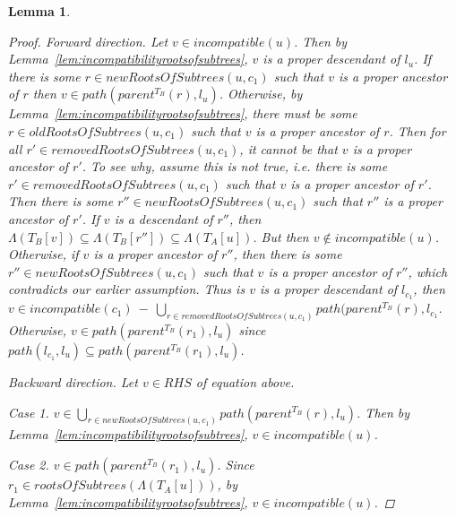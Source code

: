 \documentclass{article}
\newcommand{\leafset}{\Lambda}
\newtheorem{incompatibilityrecursive}[incompatibility]{Lemma}
\begin{document}
\begin{incompatibilityrecursive}
\begin{proof}
            \textit{Forward direction.} Let $v \in incompatible(u)$. Then by Lemma~\ref{lem:incompatibilityrootsofsubtrees}, $v$ is a proper descendant of $l_u$. If there is some $r \in newRootsOfSubtrees(u, c_1)$ such that $v$ is a proper ancestor of $r$ then $v \in path(parent^{T_B}(r), l_u)$. Otherwise, by Lemma~\ref{lem:incompatibilityrootsofsubtrees}, there must be some $r \in oldRootsOfSubtrees(u, c_1)$ such that $v$ is a proper ancestor of $r$. Then for all $r' \in removedRootsOfSubtrees(u, c_1)$, it cannot be that $v$ is a proper ancestor of $r'$. To see why, assume this is not true, i.e. there is some $r' \in removedRootsOfSubtrees(u, c_1)$ such that $v$ is a proper ancestor of $r'$. Then there is some $r'' \in newRootsOfSubtrees(u, c_1)$ such that $r''$ is a proper ancestor of $r'$. If $v$ is a descendant of $r''$, then $\leafset(T_B[v]) \subseteq \leafset(T_B[r'']) \subseteq \leafset(T_A[u])$. But then $v \not\in incompatible(u)$. Otherwise, if $v$ is a proper ancestor of $r''$, then there is some $r'' \in newRootsOfSubtrees(u, c_1)$ such that $v$ is a proper ancestor of $r''$, which contradicts our earlier assumption. Thus is $v$ is a proper descendant of $l_{c_1}$, then $v \in incompatible(c_1)\ -\ \bigcup_{r \in removedRootsOfSubtrees(u, c_1)} path(parent^{T_B}(r), l_{c_1}$. Otherwise, $v \in path(parent^{T_B}(r_1), l_u)$ since $path(l_{c_1}, l_u) \subseteq path(parent^{T_B}(r_1), l_u)$.

            \textit{Backward direction.} Let $v \in RHS$ of equation above.

            \textit{Case 1.} $v \in \bigcup_{r \in newRootsOfSubtrees(u, c_1)} path(parent^{T_B}(r), l_u)$. Then by Lemma~\ref{lem:incompatibilityrootsofsubtrees}, $v \in incompatible(u)$.

            \textit{Case 2.} $v \in path(parent^{T_B}(r_1), l_u)$. Since $r_1 \in rootsOfSubtrees(\leafset(T_A[u]))$, by Lemma~\ref{lem:incompatibilityrootsofsubtrees}, $v \in incompatible(u)$.


\end{proof}
\end{incompatibilityrecursive}
\end{document}
